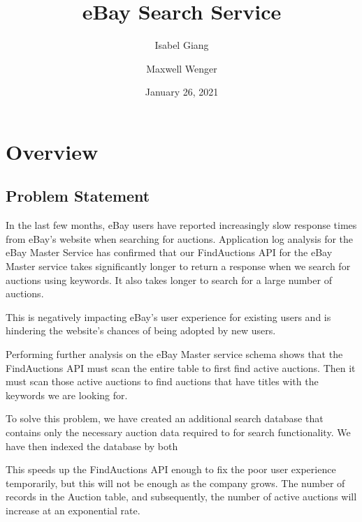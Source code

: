 \documentclass[12pt,a4paper]{article}
\title{eBay Search Service}
\author{Isabel Giang}
\author{Maxwell Wenger}
\affil{CSS490 Group Y4}
\date{January 26, 2021}
\begin{document}
\maketitle
\setcounter{tocdepth}{2}
\tableofcontents



\section{Overview}
\subsection{Problem Statement}
In the last few months, eBay users have reported increasingly slow response
times from eBay's website when searching for auctions. Application log analysis
for the eBay Master Service has confirmed that our FindAuctions API for the
eBay Master service takes significantly longer to return a response when we
search for auctions using keywords. It also takes longer to search for a large
number of auctions.

This is negatively impacting eBay's user experience for existing users and is
hindering the website's chances of being adopted by new users.

\vspace{\baselineskip}

Performing further analysis on the eBay Master service schema shows that the
FindAuctions API must scan the entire table to first find active auctions. Then
it must scan those active auctions to find auctions that have titles with the
keywords we are looking for.

To solve this problem, we have created an additional search database that
contains only the necessary auction data required to for search functionality.
We have then indexed the database by both 

This speeds up the FindAuctions API enough to fix the poor user experience
temporarily, but this will not be enough as the company grows. The number of
records in the Auction table, and subsequently, the number of active auctions
will increase at an exponential rate.
\end{document}
